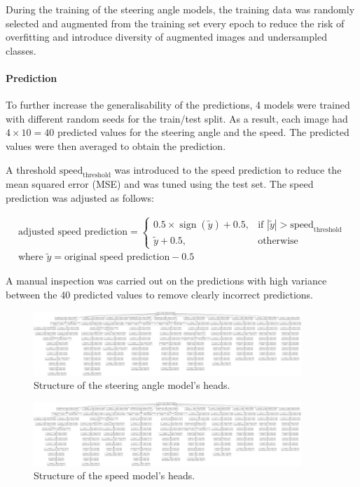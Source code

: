 \documentclass{article}
\begin{document}
During the training of the steering angle models, the training data was randomly selected and augmented from the training set every epoch to reduce the risk of overfitting and introduce diversity of augmented images and undersampled classes.


\paragraph{Prediction}
To further increase the generalisability of the predictions, 4 models were trained with different random seeds for the train/test split. As a result, each image had \( 4 \times 10 = 40 \) predicted values for the steering angle and the speed. The predicted values were then averaged to obtain the prediction.

A threshold \(\text{speed}_\text{threshold}\) was introduced to the speed prediction to reduce the mean squared error (MSE) and was tuned using the test set. The speed prediction was adjusted as follows:

\[
  \begin{aligned}
    \text{adjusted speed prediction} =
    \begin{cases}
      0.5 \times \operatorname{sign}(\tilde{y}) + 0.5, & \text{if } |\tilde{y}| > \text{speed}_\text{threshold} \\
      \tilde{y} + 0.5,                                 & \text{otherwise}
    \end{cases}
    \\
    \text{where } \tilde{y} = \text{original speed prediction} - 0.5
  \end{aligned}
\]

A manual inspection was carried out on the predictions with high variance between the 40 predicted values to remove clearly incorrect predictions.



\begin{figure}[h]
  \centering
  \includegraphics[width=0.9\textwidth]{figures/angle_heads.png}
  \caption{Structure of the steering angle model's heads.}
  \label{fig:angle_heads}
\end{figure}

\begin{figure}[h]
  \centering
  \includegraphics[width=0.9\textwidth]{figures/speed_heads.png}
  \caption{Structure of the speed model's heads.}
  \label{fig:speed_heads}
\end{figure}
\end{document}
